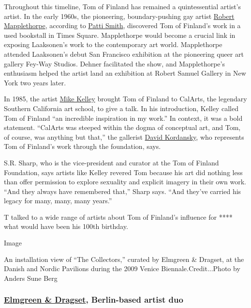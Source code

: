 Throughout this timeline, Tom of Finland has remained a quintessential
artist's artist. In the early 1960s, the pioneering, boundary-pushing
gay artist
\href{https://www.nytimes.com/2018/11/23/t-magazine/robert-mappelthorpe-michael-cunningham-elif-batuman-hilton-als.html}{Robert
Mapplethorpe}, according to
\href{https://www.nytimes.com/2015/10/07/t-magazine/patti-smith-m-train-objects.html}{Patti
Smith}, discovered Tom of Finland's work in a used bookstall in Times
Square. Mapplethorpe would become a crucial link in exposing Laaksonen's
work to the contemporary art world. Mapplethorpe attended Laaksonen's
debut San Francisco exhibition at the pioneering queer art gallery
Fey-Way Studios. Dehner facilitated the show, and Mapplethorpe's
enthusiasm helped the artist land an exhibition at Robert Samuel Gallery
in New York two years later.

In 1985, the artist
\href{https://www.nytimes.com/2017/03/08/t-magazine/art/mike-kelley-mobile-homestead.html}{Mike
Kelley} brought Tom of Finland to CalArts, the legendary Southern
California art school, to give a talk. In his introduction, Kelley
called Tom of Finland ``an incredible inspiration in my work.'' In
context, it was a bold statement. ``CalArts was steeped within the dogma
of conceptual art, and Tom, of course, was anything but that,'' the
gallerist
\href{https://tmagazine.blogs.nytimes.com/2014/09/10/david-kordansky-art-dealer-profile/}{David
Kordansky}, who represents Tom of Finland's work through the foundation,
says.

S.R. Sharp, who is the vice-president and curator at the Tom of Finland
Foundation, says artists like Kelley revered Tom because his art did
nothing less than offer permission to explore sexuality and explicit
imagery in their own work. ``And they always have remembered that,''
Sharp says. ``And they've carried his legacy for many, many, many
years.''

T talked to a wide range of artists about Tom of Finland's influence for
**** what would have been his 100th birthday.

Image

An installation view of ``The Collectors,'' curated by Elmgreen \&
Dragset, at the Danish and Nordic Pavilions during the 2009 Venice
Biennale.Credit...Photo by Anders Sune Berg

\hypertarget{elmgreen--dragset-berlin-based-artist-duo}{%
\subsubsection{\texorpdfstring{\textbf{\href{https://tmagazine.blogs.nytimes.com/2011/04/22/modern-amusement/}{Elmgreen
\& Dragset}, Berlin-based artist
duo}}{Elmgreen \& Dragset, Berlin-based artist duo}}\label{elmgreen--dragset-berlin-based-artist-duo}}

